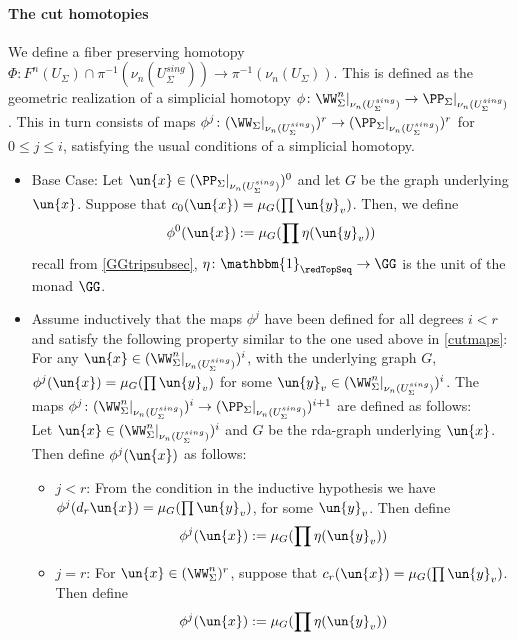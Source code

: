 \documentclass[a4paper,10pt]{amsart}
\begin{document}
\paragraph{\textbf{The cut homotopies}} We define a fiber preserving homotopy $\Phi \colon F^n (U_{\Sigma}) \cap \pi^{-1}(\nu_n(U_{\Sigma}^{sing})) \to \pi^{-1}(\nu_n(U_{\Sigma}))$. This is defined as the geometric realization of a simplicial homotopy $\phi \colon \WW^{n}_{\Sigma}|_{\nu_n(U_{\Sigma}^{sing})} \to \PP_{\Sigma}|_{\nu_n(U_{\Sigma}^{sing})}$. This in turn consists of maps $\phi^j \colon(\WW_{\Sigma}|_{\nu_n(U_{\Sigma}^{sing})})^r \to (\PP_{\Sigma}|_{\nu_n(U_{\Sigma}^{sing})})^r$ for $0 \leq j \leq i$, satisfying the usual conditions of a simplicial homotopy.\\
\begin{itemize}
\item Base Case: Let $\un{x} \in(\PP_{\Sigma}|_{\nu_n(U_{\Sigma}^{sing})})^0$ and let $G$ be the graph underlying $\un{x}$. Suppose that $c_0(\un{x})=\mu_G(\prod \un{y}_v)$. Then, we define 
	\[ \phi^0(\un{x}) := \mu_G( \prod \eta(\un{y}_v)) \]
	recall from \ref{GGtripsubsec}, $\eta \colon \mathbbm{1}_{\redTopSeq} \to \GG$ is the unit of the monad $\GG$.
\item Assume inductively that the maps $\phi^j$ have been defined for all degrees $i < r$ and satisfy the following property similar to the one used above in \ref{cutmaps}: For any $\un{x} \in (\WW^{n}_{\Sigma}|_{\nu_n(U_{\Sigma}^{sing})})^{i}$, with the underlying graph $G$, $\phi^{j} (\un{x}) = \mu_{G}( \prod \un{y}_v)$ for some $\un{y}_v \in  (\WW^{n}_{\Sigma}|_{\nu_n(U_{\Sigma}^{sing})})^{i}$. The maps $\phi^j \colon (\WW^{n}_{\Sigma}|_{\nu_n(U_{\Sigma}^{sing})})^{i} \to (\PP_{\Sigma}|_{\nu_n(U_{\Sigma}^{sing})})^{i+1}$ are defined as follows:\\
Let $\un{x} \in  (\WW^{n}_{\Sigma}|_{\nu_n(U_{\Sigma}^{sing})})^{i}$ and $G$ be the rda-graph underlying $\un{x}$. Then define $\phi^j(\un{x})$ as follows:
	\begin{itemize}
		\item $j <r$: From the condition in the inductive hypothesis we have $\phi^j(d_r\un{x}) = \mu_G( \prod \un{y}_v)$, for some $\un{y}_v$. Then define
		 \[\phi^j(\un{x}) := \mu_G ( \prod \eta(\un{y}_v) )\]
		\item $j=r$: For $\un{x} \in  (\WW^{n}_{\Sigma})^{r}$, suppose that $c_r(\un{x}) = \mu_G(\prod \un{y}_v)$. Then define
		\[ \phi^j(\un{x}) := \mu_G( \prod \eta(\un{y}_v)) \]
	\end{itemize}
\end{itemize}
\end{document}
